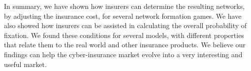 In summary, we have shown how insurers can determine the resulting networks, by adjusting the insurance cost, for several network formation games. We have also showed how insurers can be assisted in calculating the overall probability of fixation.
We found these conditions for several models, with different properties that relate them to the real world and other insurance products. We believe our findings can help the cyber-insurance market evolve into a very interesting and useful market.

